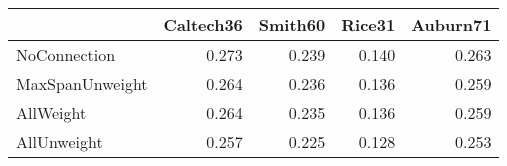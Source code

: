 \begin{tabular}{lrrrr}
\toprule
{} & Caltech36 & Smith60 & Rice31 & Auburn71 \\
\midrule
NoConnection    &     0.273 &   0.239 &  0.140 &    0.263 \\
MaxSpanUnweight &     0.264 &   0.236 &  0.136 &    0.259 \\
AllWeight       &     0.264 &   0.235 &  0.136 &    0.259 \\
AllUnweight     &     0.257 &   0.225 &  0.128 &    0.253 \\
\bottomrule
\end{tabular}
